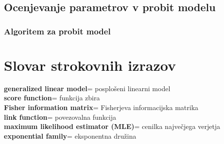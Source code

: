 \documentclass[12pt,a4paper]{amsart}
\theoremstyle{definition} %
\theoremstyle{plain} %
\newcommand{\geslo}[2]{\noindent\textbf{#1}\hspace*{3mm}\hangindent=\parindent\hangafter=1 #2}
\begin{document}
\subsection{Ocenjevanje parametrov v probit modelu}

\subsubsection{Algoritem za probit model}



\section*{Slovar strokovnih izrazov}

\geslo{generalized linear model}{posplošeni linearni model}\\
\geslo{score function}{funkcija zbira}\\
\geslo{Fisher information matrix}{Fisherjeva informacijska matrika}\\
\geslo{link function}{povezovalna funkcija}\\
\geslo{maximum likelihood estimator (MLE)}{cenilka največjega verjetja}\\
\geslo{exponential family}{eksponentna družina}
%
%
\nocite{*}


\end{document}
